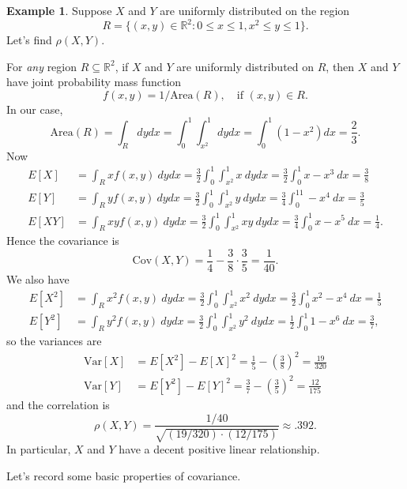 \documentclass[12pt]{article}
\theoremstyle{plain}
\theoremstyle{definition}
\newtheorem{example}[theorem]{Example}
\theoremstyle{remark}
\newcommand{\Var}{\ensuremath{\textrm{Var}}}
\newcommand{\Cov}{\ensuremath{\textrm{Cov}}}
\newcommand{\R}{\mathbb{R}}
\begin{document}
\begin{example}
Suppose $X$ and $Y$ are uniformly distributed on the region
\[
    R = \{(x,y)\in \R^2: 0\leq x \leq 1, x^2 \leq  y \leq 1\}.
\]
Let's find $\rho(X,Y)$.

For \emph{any} region $R\subseteq \R^2$, if $X$ and $Y$ are uniformly distributed on $R$, then $X$ and $Y$ have joint probability mass function
\[
    f(x,y) = 1/\text{Area}(R),\quad\text{if }(x,y)\in R.
\]
In our case,
\[
    \text{Area}(R) = \int_R dydx = \int_0^1\int_{x^2}^1dydx = \int_0^1(1-x^2)dx = \frac{2}{3}.
\]
Now
\begin{align*}
    E[X] &= \int_R x f(x,y)\ dydx = \frac{3}{2}\int_0^1\int_{x^2}^1x\ dydx = \frac{3}{2}\int_0^1x - x^3\ dx= \frac{3}{8}\\
    E[Y] &= \int_R y f(x,y)\ dydx = \frac{3}{2}\int_0^1\int_{x^2}^1y\ dydx = \frac{3}{4}\int_0^11 - x^4\ dx= \frac{3}{5}\\
    E[XY] &= \int_R xyf(x,y)\ dydx = \frac{3}{2}\int_0^1\int_{x^2}^1xy\ dydx = \frac{3}{4}\int_0^1x - x^5\ dx = \frac{1}{4}.
\end{align*}
Hence the covariance is
\[
    \Cov(X,Y) = \frac{1}{4} - \frac{3}{8}\cdot \frac{3}{5} = \frac{1}{40}.
\]
We also have
\begin{align*}
    E[X^2] &= \int_R x^2 f(x,y)\ dydx = \frac{3}{2}\int_0^1\int_{x^2}^1x^2\ dydx = \frac{3}{2}\int_0^1x^2 - x^4\ dx = \frac{1}{5}\\
    E[Y^2] &= \int_R y^2 f(x,y)\ dydx = \frac{3}{2}\int_0^1\int_{x^2}^1y^2\ dydx = \frac{1}{2}\int_0^1 1 - x^6\ dx = \frac{3}{7},
\end{align*}
so the variances are
\begin{align*}
    \Var[X] &= E[X^2] - E[X]^2 = \frac{1}{5} - \left(\frac{3}{8}\right)^2 = \frac{19}{320}\\
    \Var[Y] &= E[Y^2] - E[Y]^2 = \frac{3}{7} - \left(\frac{3}{5}\right)^2 = \frac{12}{175}
\end{align*}
and the correlation is
\[
    \rho(X,Y) = \frac{1/40}{\sqrt{(19/320)\cdot (12/175)}} \approx .392.
\]
In particular, $X$ and $Y$ have a decent positive linear relationship.
\end{example}


Let's record some basic properties of covariance.
\end{document}
